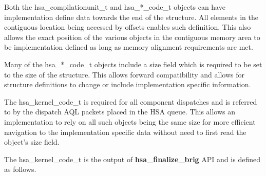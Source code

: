 \documentclass{book}
\newcommand{\reffun}[1]{\textbf{#1}}
\newcommand{\reftyp}[1]{#1}
\begin{document}
\begin{appendices}
 

Both the \reftyp{hsa\_compilationunit\_t} and
\reftyp{hsa\_*\_code\_t} objects can have implementation define data
towards the end of the structure. All elements in the contiguous
location being accessed by offsets enables such definition.  This
also allows the exact position of the various objects in the
contiguous memory area to be implementation defined as long as
memory alignment requirements are met.

Many of the \reftyp{hsa\_*\_code\_t} objects include a size field
which is required to be set to the size of the structure. This
allows forward compatibility and allows for structure definitions to
change or include implementation specific information.

The \reftyp{hsa\_kernel\_code\_t} is required for all component
dispatches and is referred to by the dispatch AQL packets placed in
the HSA queue. This allows an implementation to rely on all such
objects being the same size for more efficient navigation to the
implementation specific data without need to first read the object's
size field.

The \reftyp{hsa\_kernel\_code\_t} is the output of
\reffun{hsa\_finalize\_brig} API and is defined as follows.

\makeatletter{}


\end{appendices}
\end{document}
